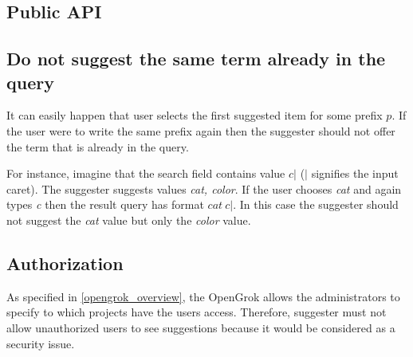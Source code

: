 \subsection{Public API}


\subsection{Do not suggest the same term already in the query}
It can easily happen that user selects the first suggested item for some prefix $p$. If the user were to write the same
prefix again then the suggester should not offer the term that is already in the query.

For instance, imagine that the search field contains value $c\vert$ ($\vert$ signifies the input caret). The suggester
suggests values \textit{cat, color}. If the user chooses \textit{cat} and again types \textit{c} then the result
query has format $cat\ c\vert$. In this case the suggester should not suggest the \textit{cat} value but only the \textit{color}
value.

\subsection{Authorization}
As specified in \ref{opengrok_overview}, the OpenGrok allows the administrators to specify to which projects have the users
access. Therefore, suggester must not allow unauthorized users to see suggestions because it would be considered as a security issue.

